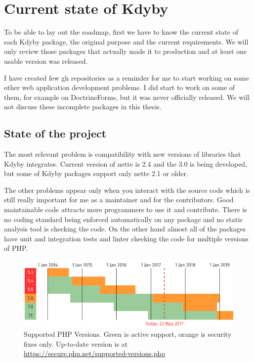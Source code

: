 \chapter{Current state of Kdyby}

To be able to lay out the roadmap, first we have to know the current state of each Kdyby package, the original purpose and the current requirements. We will only review those packages that actually made it to production and at least one usable version was released.

I have created few \gls{gh} repositories as a reminder for me to start working on some other web application development problems. I did start to work on some of them, for example on DoctrineForms, but it was never officially released. We will not discuss these incomplete packages in this thesis.

\section{State of the project}

The most relevant problem is compatibility with new versions of libraries that Kdyby integrates. Current version of \gls{nette} is 2.4 and the 3.0 is being developed, but some of Kdyby packages support only \gls{nette} 2.1 or older.

The other problems appear only when you interact with the source code which is still really important for me as a maintainer and for the contributors. Good maintainable code attracts more programmers to use it and contribute. There is no coding standard being enforced automatically on any package and no static analysis tool is checking the code. On the other hand almost all of the packages have unit and integration tests and linter checking the code for multiple versions of PHP.

\begin{figure} \label{fig:php:supported-versions}
  \centering
    \includegraphics[width=1\textwidth]{src/assets/php-supported-versions.png}
  \caption{Supported PHP Versions. Green is active support, orange is security fixes only. Up-to-date version is at \url{https://secure.php.net/supported-versions.php}}
\end{figure}

